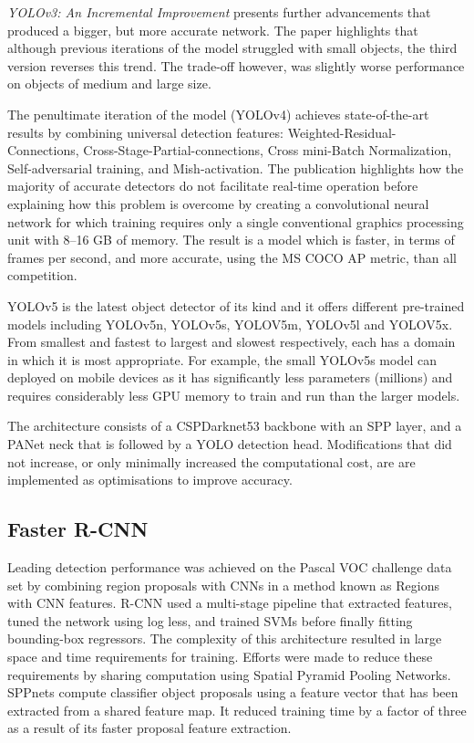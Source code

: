 \documentclass{thesis}
\begin{document}
\textit{YOLOv3: An Incremental Improvement} presents further advancements that produced a bigger, but more accurate network. The paper highlights that although previous iterations of the model struggled with small objects, the third version reverses this trend. The trade-off however, was slightly worse performance on objects of medium and large size\cite{yolo3}.

The penultimate iteration of the model (YOLOv4) achieves state-of-the-art results by combining universal detection features: Weighted-Residual-Connections, Cross-Stage-Partial-connections, Cross mini-Batch Normalization, Self-adversarial training, and Mish-activation\cite{yolov4}. The publication highlights how the majority of accurate detectors do not facilitate real-time operation before explaining how this problem is overcome by creating a convolutional neural network for which training requires only a single conventional graphics processing unit with 8--16 GB of memory. The result is a model which is faster, in terms of frames per second, and more accurate, using the MS COCO AP metric, than all competition.

YOLOv5 is the latest object detector of its kind and it offers different pre-trained models including YOLOv5n, YOLOv5s, YOLOV5m, YOLOv5l and YOLOV5x. From smallest and fastest to largest and slowest respectively, each has a domain in which it is most appropriate. For example, the small YOLOv5s model can deployed on mobile devices as it has significantly less parameters (millions) and requires considerably less GPU memory to train and run than the larger models\cite{yolov5}.

The architecture consists of a CSPDarknet53 backbone with an SPP layer, and a PANet neck that is followed by a YOLO detection head\cite{yolov1}. Modifications that did not increase, or only minimally increased the computational cost, are are implemented as optimisations to improve accuracy\cite{yolov4}.

\subsection{Faster R-CNN}

Leading detection performance was achieved on the Pascal VOC challenge data set by combining region proposals with CNNs in a method known as Regions with CNN features. R-CNN used a multi-stage pipeline that extracted features, tuned the network using log less, and trained SVMs before finally fitting bounding-box regressors\cite{rcnn}. The complexity of this architecture resulted in large space and time requirements for training. Efforts were made to reduce these requirements by sharing computation using Spatial Pyramid Pooling Networks. SPPnets compute classifier object proposals using a feature vector that has been extracted from a shared feature map. It reduced training time by a factor of three as a result of its faster proposal feature extraction\cite{he2015spatial}.
\end{document}
